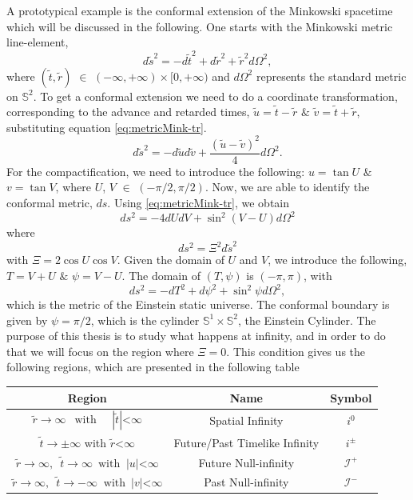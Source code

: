 A prototypical example is the conformal extension of the Minkowski spacetime which will be discussed in the following.  One starts with the Minkowski metric line-element,
\begin{equation}\label{eq:metricMink-tr}
	d \tilde{s}^2=-d \tilde{t}^2+d \tilde{r}^2+\tilde{r}^2 d
        \Omega^2,
\end{equation}
where $(\tilde{t}, \tilde{r})$ $\in$ $(-\infty,+\infty) \times[0,+\infty)$ and $d \Omega^2$ represents the standard metric on $\mathbb{S}^2$. To get a conformal extension we need to do a coordinate transformation, corresponding to the advance and retarded  times, $\tilde{u}=\tilde{t}-\tilde{r}$ $\&$ $\tilde{v}=\tilde{t}+\tilde{r}$,  substituting equation \eqref{eq:metricMink-tr}.
\begin{equation}\label{eq:metricMink-tr1}
	d \tilde{s}^2=-d \tilde{u} d \tilde{v}+\frac{(\tilde{u}-\tilde{v})^2}{4} d \Omega^2.
\end{equation}
For the compactification, we need to introduce the following: $u = \tan U$ $\&$ $v = \tan V$, where $U$, $V$ $\in$ $(- \pi/2, \pi/2)$. Now, we are able to identify the conformal metric,
$ds$. Using \eqref{eq:metricMink-tr}, we obtain
$$d s^2=-4 d U d V+\sin ^2(V-U) d \Omega^2$$ where
$$d s^2=\Xi^2 d \tilde{s}^2$$
with $\Xi=2 \cos U \cos V$. Given the
domain of $U$ and $V$, we introduce the following, $T=V+U$ $\&$ $\psi=V-U$. The domain of $(T, \psi)$ is $(-\pi, \pi)$, with
\begin{equation}\label{eq:metricMink-cf}
	d s^2=-d T^2+d \psi^2+\sin ^2 \psi d \Omega^2,
\end{equation}
which is the metric of the Einstein static universe. The conformal boundary is given by $\psi = \pi/2$, which is the cylinder $\mathbb{S}^1 \times \mathbb{S}^2$, the Einstein Cylinder. The purpose of this thesis is  to study what happens at infinity, and in order to do that we will focus on the region where $\Xi = 0$. This condition gives us the following regions, which are presented in the following table
\begin{center}
    \begin{tabular}{ |c|c|c| }
      \hline
      Region & Name & Symbol \\
     \hline
     $\tilde{r} \rightarrow \infty \enspace \;  \text{with} \; \;\;\;\;
     |\tilde{t}| $<$ \infty$ & Spatial Infinity & $i^{0}$ \\
     \hline 
     $\tilde{t} \rightarrow \pm \infty$  \;\; with \;\; $\tilde{r}$<$\infty$
     \enspace & Future/Past Timelike Infinity & $i^{\pm}$ \\
     \hline
     $\tilde{r} \rightarrow \infty, \enspace \tilde{t} \rightarrow \infty \enspace
     \text{with} \;\; |u|$<$\infty$ &  Future Null-infinity & $\mathscr{I}^+$ \\ 
     \hline
     $\tilde{r} \rightarrow\infty, \enspace \tilde{t} \rightarrow-\infty \;\;
     \text{with} \enspace |v|$<$\infty$ & Past Null-infinity & $\mathscr{I}^-$ \\
     \hline
    \end{tabular}
    \end{center}
